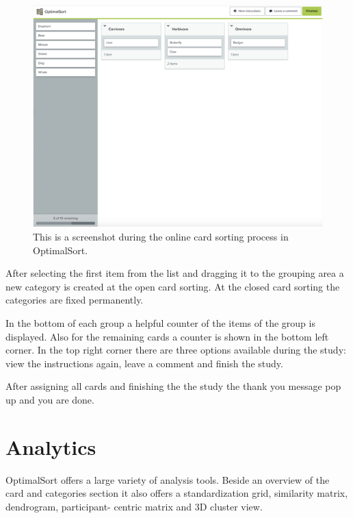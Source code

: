 \begin{figure}[h] 
\centering
\includegraphics[keepaspectratio,width=\linewidth,height=\halfh]{images/optimalsort-sorting.png}
\caption[OptimalSort Card Sorting] { This is a screenshot during the online card
sorting process in OptimalSort.
 }
\label{fig:OptimalSort2}
\end{figure}

After selecting the first item from the list and dragging it to the grouping area a new category is 
created at the open card sorting. At the closed card sorting the categories are fixed permanently. 

In the bottom of each group a helpful counter of the items of the group is displayed. Also for the 
remaining cards a counter is shown in the bottom left corner. In the top right corner there are three 
options available during the study: view the instructions again, leave a comment and finish the 
study. 

After assigning all cards and finishing the the study the thank you message pop up and you are 
done. 


\section{Analytics}
OptimalSort offers a large variety of analysis tools. Beside an overview of the card and
categories section it also offers a standardization grid, similarity matrix, dendrogram, participant-
centric matrix and 3D cluster view. 

